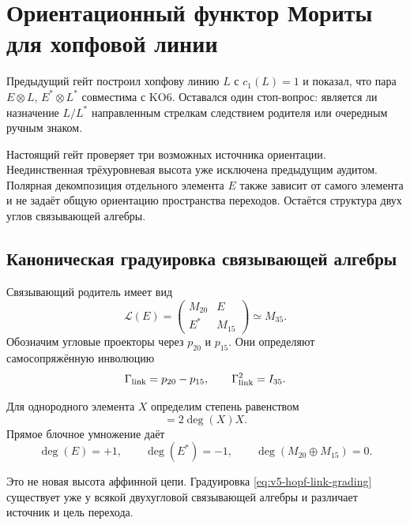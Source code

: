 \chapter{Ориентационный функтор Мориты для хопфовой линии}

Предыдущий гейт построил хопфову линию $L$ с $c_1(L)=1$ и показал, что
пара $E\otimes L$, $E^*\otimes L^*$ совместима с KO6. Оставался один
стоп-вопрос: является ли назначение $L/L^*$ направленным стрелкам
следствием родителя или очередным ручным знаком.

Настоящий гейт проверяет три возможных источника ориентации. Неединственная
трёхуровневая высота уже исключена предыдущим аудитом. Полярная
декомпозиция отдельного элемента $E$ также зависит от самого элемента и
не задаёт общую ориентацию пространства переходов. Остаётся структура
двух углов связывающей алгебры.

\section{Каноническая градуировка связывающей алгебры}

Связывающий родитель имеет вид
\begin{equation}
 \mathcal L(E)=
 \begin{pmatrix}
  M_{20}&E\\
  E^*&M_{15}
 \end{pmatrix}
 \simeq M_{35}.
\end{equation}
Обозначим угловые проекторы через $p_{20}$ и $p_{15}$. Они определяют
самосопряжённую инволюцию
\begin{equation}
 \Gamma_{\rm link}=p_{20}-p_{15},
 \qquad
 \Gamma_{\rm link}^2=I_{35}.
 \label{eq:v5-hopf-link-grading}
\end{equation}

Для однородного элемента $X$ определим степень равенством
\begin{equation}
 [\Gamma_{\rm link},X]=2\deg(X)X.
 \label{eq:v5-hopf-link-degree}
\end{equation}
Прямое блочное умножение даёт
\begin{equation}
 \deg(E)=+1,
 \qquad
 \deg(E^*)=-1,
 \qquad
 \deg(M_{20}\oplus M_{15})=0.
 \label{eq:v5-hopf-link-degrees}
\end{equation}

Это не новая высота аффинной цепи. Градуировка
\eqref{eq:v5-hopf-link-grading} существует уже у всякой двухугловой
связывающей алгебры и различает источник и цель перехода.

